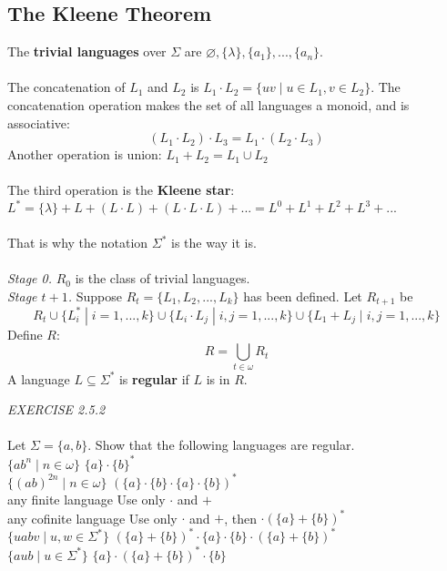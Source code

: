 \documentclass{article}
\begin{document}
\subsection{The Kleene Theorem}
The \textbf{trivial languages} over \(\Sigma\) are \(\varnothing,\{\lambda\},\{a_{1}\},...,\{a_{n}\}\).\\\\
The concatenation of \(L_{1}\) and \(L_{2}\) is \(L_{1}\cdot L_{2}=\{uv\;|\;u\in L_{1},v\in L_{2}\}\). The concatenation operation makes the set of all languages a monoid, and is associative:
\[(L_{1}\cdot L_{2})\cdot L_{3}=L_{1}\cdot (L_{2}\cdot L_{3})\]
Another operation is union: \(L_{1}+L_{2}=L_{1}\cup L_{2}\)\\\\
The third operation is the \textbf{Kleene star}: \(L^{*}=\{\lambda\}+L+(L\cdot L)+(L\cdot L\cdot L)+...=L^{0}+L^{1}+L^{2}+L^{3}+...\)\\\\
That is why the notation \(\Sigma^{*}\) is the way it is.\\\\
\textit{Stage 0. }\(R_{0}\) is the class of trivial languages.\\
\textit{Stage \(t+1\). } Suppose \(R_{t}=\{L_{1},L_{2},...,L_{k}\}\) has been defined. Let \(R_{t+1}\) be 
\[R_{t}\cup\{L_{i}^{*}\;|\;i=1,...,k\}\cup\{L_{i}\cdot L_{j}\;|\;i,j=1,...,k\}\cup\{L_{1}+L_{j}\;|\;i,j=1,...,k\}\]
Define \(R\):\[R=\bigcup_{t\in\omega}R_{t}\]
A language \(L\subseteq\Sigma^{*}\) is \textbf{regular} if \(L\) is in \(R\).
\begin{siderules}\color{blue}\textit{EXERCISE 2.5.2}\color{black}\\\\
\color{blue}Let \(\Sigma=\{a,b\}\). Show that the following languages are regular.\\
\(\{ab^{n}\;|\;n\in\omega\}\) \color{black} \(\{a\}\cdot \{b\}^{*}\)\\\color{blue}
\(\{(ab)^{2n}\;|\;n\in\omega\}\) \color{black} \((\{a\}\cdot\{b\}\cdot\{a\}\cdot\{b\})^{*}\)\\\color{blue}
any finite language \color{black} Use only \(\cdot\) and \(+\) \\\color{blue}
any cofinite language \color{black} Use only \(\cdot\) and \(+\), then \(\cdot (\{a\}+\{b\})^{*}\)\\\color{blue}
\(\{uabv\;|\;u,w\in\Sigma^{*}\}\) \color{black} \((\{a\}+\{b\})^{*}\cdot\{a\}\cdot\{b\}\cdot(\{a\}+\{b\})^{*}\)\\\color{blue}
\(\{aub\;|\;u\in\Sigma^{*}\}\) \color{black} \(\{a\}\cdot (\{a\}+\{b\})^{*}\cdot \{b\}\)
\end{siderules}
\end{document}
